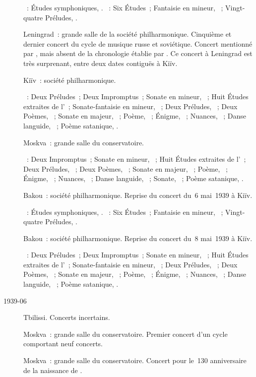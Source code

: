 \begin{description}
 \textsc{\Schumann{}}~: Études symphoniques, .
 \textsc{\Chopin{}}~: Six Études~; Fantaisie en \kF mineur, ~;
 Vingt-quatre Préludes, .
 \item[\DateWithWeekDay{1939-05-07}]
 Leningrad~: grande salle de la société philharmonique.
 Cinquième et dernier concert du cycle de musique russe et soviétique.
 Concert mentionné par \citet[p.~160]{Nekrasova08}, mais absent de la
 chronologie établie par \citet[p.~414]{Scriabine}.
 Ce concert à Leningrad est très surprenant, entre deux dates contiguës à
 Kiïv.
 \item[\DateWithWeekDay{1939-05-08}]
 Kiïv~: société philharmonique.

 \textsc{\Scriabine{}}~: Deux Préludes~; Deux Impromptus~; Sonate en \kF
 \Sharp mineur, ~; Huit Études extraites de l'~;
 Sonate-fantaisie en \kG \Sharp mineur, ~; Deux Préludes,
 ~; Deux Poèmes, ~; Sonate en \kF \Sharp majeur,
 ~; Poème,  ~; Énigme,  ~;
 Nuances,  ~; Danse languide,  ~;
 Poème satanique, .
 \item[\DateWithWeekDay{1939-05-18}]
 Moskva~: grande salle du conservatoire.

 \textsc{\Scriabine{}}~: Deux Impromptus~; Sonate en \kF \Sharp mineur,
 ~; Huit Études extraites de l'~; Deux Préludes,
 ~; Deux Poèmes, ~; Sonate en \kF \Sharp majeur,
 ~; Poème,  ~; Énigme,  ~;
 Nuances,  ~; Danse languide,  ~;
 Sonate, ~; Poème satanique, .
 \item[\DateWithWeekDay{1939-05-24}]
 Bakou~: société philharmonique.
 Reprise du concert du~6 mai~1939 à Kiïv.

 \textsc{\Schumann{}}~: Études symphoniques, .
 \textsc{\Chopin{}}~: Six Études~; Fantaisie en \kF mineur, ~;
 Vingt-quatre Préludes, .
 \item[\DateWithWeekDay{1939-05-26}]
 Bakou~: société philharmonique.
 Reprise du concert du~8 mai~1939 à Kiïv.

 \textsc{\Scriabine{}}~: Deux Préludes~; Deux Impromptus~; Sonate en \kF
 \Sharp mineur, ~; Huit Études extraites de l'~;
 Sonate-fantaisie en \kG \Sharp mineur, ~; Deux Préludes,
 ~; Deux Poèmes, ~; Sonate en \kF \Sharp majeur,
 ~; Poème,  ~; Énigme,  ~;
 Nuances,  ~; Danse languide,  ~;
 Poème satanique, .
 \item[1939-06]
 Tbilissi.
 Concerts incertains.
 \item[\DateWithWeekDay{1939-09-15}]
 Moskva~: grande salle du conservatoire.
 Premier concert d'un cycle \Chopin{} comportant neuf concerts.
 \item[\DateWithWeekDay{1939-10-09}]
 Moskva~: grande salle du conservatoire.
 Concert pour le~130\ieme{} anniversaire de la naissance de \Schumann{}.


\end{description}
